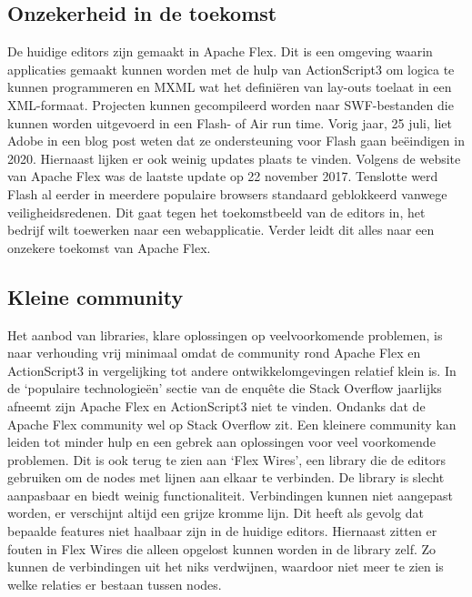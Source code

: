 \subsection{Onzekerheid in de toekomst}
De huidige editors zijn gemaakt in Apache Flex. Dit is een omgeving waarin applicaties gemaakt kunnen worden met de hulp van ActionScript3 om logica te kunnen programmeren en MXML wat het definiëren van lay-outs toelaat in een XML-formaat\cite{WhatIsApacheFlex}. Projecten kunnen gecompileerd worden naar SWF-bestanden die kunnen worden uitgevoerd in een Flash- of Air run time. Vorig jaar, 25 juli, liet Adobe in een blog post weten dat ze ondersteuning voor Flash gaan beëindigen in 2020\cite{AdobeFlashFuture}. Hiernaast lijken er ook weinig updates plaats te vinden. Volgens de website van Apache Flex was de laatste update op 22 november 2017\cite{ApacheFlex}. Tenslotte werd Flash al eerder in meerdere populaire browsers standaard geblokkeerd vanwege veiligheidsredenen\cite{FlashWillBeBlocked}. Dit gaat tegen het toekomstbeeld van de editors in, het bedrijf wilt toewerken naar een webapplicatie. Verder leidt dit alles naar een onzekere toekomst van Apache Flex.

\subsection{Kleine community}
Het aanbod van libraries, klare oplossingen op veelvoorkomende problemen, is naar verhouding vrij minimaal omdat de community rond Apache Flex en ActionScript3 in vergelijking tot andere ontwikkelomgevingen relatief klein is. In de ‘populaire technologieën’ sectie van de enquête die Stack Overflow jaarlijks afneemt zijn Apache Flex en ActionScript3 niet te vinden\cite{StackOverflowSurvey2018}. Ondanks dat de Apache Flex community wel op Stack Overflow zit\cite{StackOverflowFlexQuestions}. Een kleinere community kan leiden tot minder hulp en een gebrek aan oplossingen voor veel voorkomende problemen. Dit is ook terug te zien aan ‘Flex Wires’, een library die de editors gebruiken om de nodes met lijnen aan elkaar te verbinden. De library is slecht aanpasbaar en biedt weinig functionaliteit. Verbindingen kunnen niet aangepast worden, er verschijnt altijd een grijze kromme lijn. Dit heeft als gevolg dat bepaalde features niet haalbaar zijn in de huidige editors. Hiernaast zitten er fouten in Flex Wires die alleen opgelost kunnen worden in de library zelf. Zo kunnen de verbindingen uit het niks verdwijnen, waardoor niet meer te zien is welke relaties er bestaan tussen nodes.

